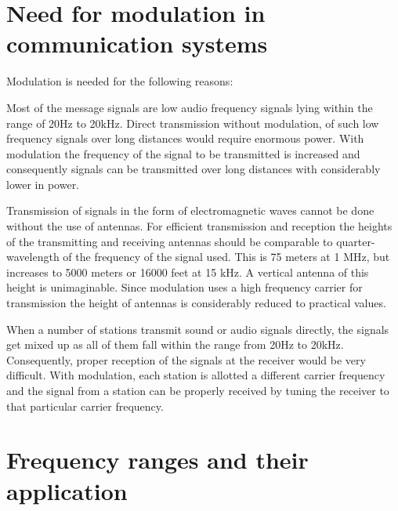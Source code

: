\section{Need for modulation in communication systems}\label{sec9.5}

Modulation is needed for the following reasons:

\smallskip
{}

Most of the message signals are low audio frequency signals lying within the range of 20Hz to 20kHz. Direct transmission without modulation, of such low frequency signals over long distances would require enormous power. With modulation the frequency of the signal to be transmitted is increased and consequently signals can be transmitted over long distances with considerably lower in power.

\smallskip
{}

Transmission of signals in the form of electromagnetic waves cannot be done without the use of antennas. For efficient transmission and reception the heights of the transmitting and receiving antennas should be comparable to quarter-wavelength of the frequency of the signal used. This is 75 meters at 1 MHz, but increases to 5000 meters or 16000 feet at 15 kHz. A vertical antenna of this height is unimaginable. Since modulation uses a high frequency carrier for transmission the height of antennas is considerably reduced to practical values.

\smallskip
{}

When a number of stations transmit sound or audio signals directly, the signals get mixed up as all of them fall within the range from 20Hz to 20kHz. Consequently, proper reception of the signals at the receiver would be very difficult. With modulation, each station is allotted a different carrier frequency and the signal from a station can be properly received by tuning the receiver to that particular carrier frequency.\\[-20pt]

\section{Frequency ranges and their application}\label{sec9.6}

